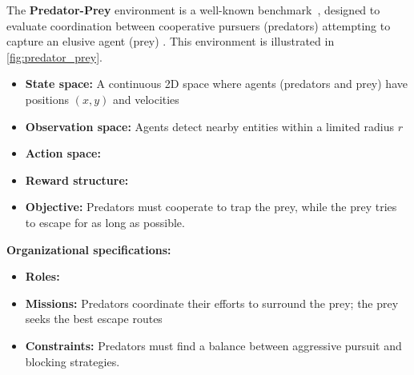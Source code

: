 The \textbf{Predator-Prey} environment is a well-known  benchmark~\cite{lowe2017multi}, designed to evaluate coordination between cooperative pursuers (predators) attempting to capture an elusive agent (prey) . This environment is illustrated in \autoref{fig:predator_prey}.
%
\begin{itemize}
  \item \textbf{State space:} A continuous 2D space where agents (predators and prey) have positions $(x, y)$ and velocities
  \item \textbf{Observation space:} Agents detect nearby entities within a limited radius $r$
  \item \textbf{Action space:}
  \item \textbf{Reward structure:}
  \item \textbf{Objective:} Predators must cooperate to trap the prey, while the prey tries to escape for as long as possible.
\end{itemize}
%
\textbf{Organizational specifications:}
\begin{itemize}
  \item \textbf{Roles:} 
  \item \textbf{Missions:} Predators coordinate their efforts to surround the prey; the prey seeks the best escape routes
  \item \textbf{Constraints:} Predators must find a balance between aggressive pursuit and blocking strategies.
\end{itemize}
%
